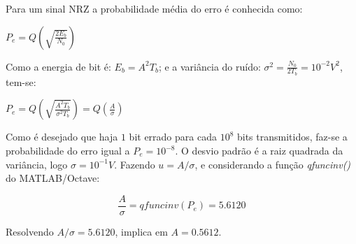 Para um sinal NRZ a probabilidade média do erro é conhecida como:

\begin{center}
    $P_e = Q\left(\sqrt{\frac{2E_b}{N_0}}\right)$
\end{center}

Como a energia de bit é: $E_b = A^2T_b$; e a variância do ruído: $\sigma^2 = \frac{N_0}{2T_b} = 10^{-2} V^2$, tem-se:

\begin{center}
    $P_e = Q\left(\sqrt{\frac{A^2T_b}{\sigma^2T_b}}\right) = Q\left(\frac{A}{\sigma}\right)$
\end{center}

Como é desejado que haja $1$ bit errado para cada $10^8$ bits transmitidos, faz-se a probabilidade do erro igual a $P_e=10^{-8}$. O desvio padrão é a raiz quadrada da variância, logo $\sigma = 10^{-1} V$. Fazendo $u = A/\sigma$, e considerando a função \textit{qfuncinv()} do MATLAB/Octave:

\begin{equation} \label{q07:1}
    \frac{A}{\sigma} = qfuncinv(P_e) = 5.6120
\end{equation}

Resolvendo $A/\sigma = 5.6120$, implica em $A = 0.5612$.









